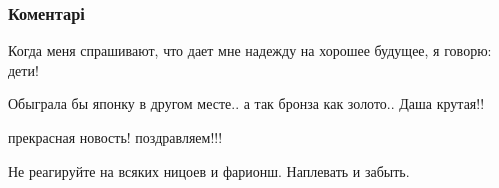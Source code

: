  
 
 
 
 
\subsubsection{Коментарі}
\label{sec:24_07_2021.fb.molchanov_jurij.1.s_pobedoj.cmt}

\begin{itemize}
 
Когда меня спрашивают, что дает мне надежду на хорошее будущее, я говорю: дети!

 
Обыграла бы японку в другом месте.. а так бронза как золото.. Даша крутая!!

 
прекрасная новость! поздравляем!!!

 
Не реагируйте на всяких ницоев и фарионш. Наплевать и забыть.

\begin{itemize}
 

\end{itemize}
\end{itemize}
